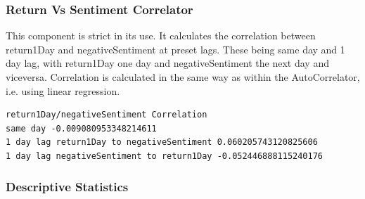 \subsubsection{Return Vs Sentiment Correlator}

This component is strict in its use. It calculates the correlation between return1Day and negativeSentiment at preset lags. These being same day and 1 day lag, with return1Day one day and negativeSentiment the next day and viceversa. Correlation is calculated in the same way as within the AutoCorrelator, i.e. using linear regression.

\begin{lstlisting}[caption=Example Return Vs Sentiment Output]
return1Day/negativeSentiment Correlation
same day -0.009080953348214611
1 day lag return1Day to negativeSentiment 0.060205743120825606
1 day lag negativeSentiment to return1Day -0.052446888115240176
\end{lstlisting}

\subsubsection{Descriptive Statistics}

